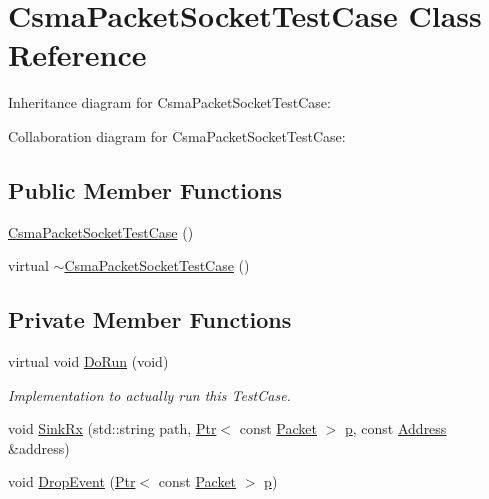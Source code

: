 \hypertarget{classCsmaPacketSocketTestCase}{}\section{Csma\+Packet\+Socket\+Test\+Case Class Reference}
\label{classCsmaPacketSocketTestCase}


Inheritance diagram for Csma\+Packet\+Socket\+Test\+Case\+:


Collaboration diagram for Csma\+Packet\+Socket\+Test\+Case\+:
\subsection*{Public Member Functions}
\begin{DoxyCompactItemize}
\item 
\hyperlink{classCsmaPacketSocketTestCase_a44ccb5b6fcea58d59b6f30c6dba848f4}{Csma\+Packet\+Socket\+Test\+Case} ()
\item 
virtual \hyperlink{classCsmaPacketSocketTestCase_a7d2d1a708f95e18e8c3c1d801c2204fe}{$\sim$\+Csma\+Packet\+Socket\+Test\+Case} ()
\end{DoxyCompactItemize}
\subsection*{Private Member Functions}
\begin{DoxyCompactItemize}
\item 
virtual void \hyperlink{classCsmaPacketSocketTestCase_a384d3d4dbc79ff809f5104e344ef6da5}{Do\+Run} (void)
\begin{DoxyCompactList}\small\item\em Implementation to actually run this Test\+Case. \end{DoxyCompactList}\item 
void \hyperlink{classCsmaPacketSocketTestCase_a16d379694fabb2066be0ab69a17f3014}{Sink\+Rx} (std\+::string path, \hyperlink{classns3_1_1Ptr}{Ptr}$<$ const \hyperlink{classns3_1_1Packet}{Packet} $>$ \hyperlink{lte__link__budget__x2__handover__measures_8m_ac9de518908a968428863f829398a4e62}{p}, const \hyperlink{classns3_1_1Address}{Address} \&address)
\item 
void \hyperlink{classCsmaPacketSocketTestCase_ab1f3757c8fbdf985073d2b7fa0188e38}{Drop\+Event} (\hyperlink{classns3_1_1Ptr}{Ptr}$<$ const \hyperlink{classns3_1_1Packet}{Packet} $>$ \hyperlink{lte__link__budget__x2__handover__measures_8m_ac9de518908a968428863f829398a4e62}{p})
\end{DoxyCompactItemize}
